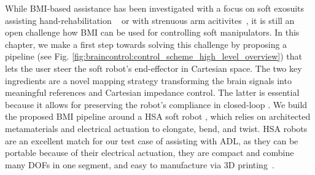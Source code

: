 While \gls{BMI}-based assistance has been investigated with a focus on 
soft exosuits assisting hand-rehabilitation ~\citep{zhang2019eeg} or with strenuous arm acitivites~\citep{tacca2022neuro}, 
it is still an open challenge how \gls{BMI} can be used for controlling soft manipulators. 
In this chapter, we make a first step towards solving this challenge by proposing a pipeline (see Fig. \ref{fig:braincontrol:control_scheme_high_level_overview}) that lets the user steer the soft robot's end-effector in Cartesian space. The two key ingredients are a novel mapping strategy transforming the brain signals into meaningful references and Cartesian impedance control. The latter is essential because it allows for preserving the robot's compliance in closed-loop \citep{della2017controlling}. We build the proposed \gls{BMI} pipeline around a \gls{HSA} soft robot \citep{stolzle2023modelling, stolzle2024experimental}, %
which relies on architected metamaterials and electrical actuation to elongate, bend, and twist.
\gls{HSA} robots are an excellent match for our test case of assisting with \gls{ADL}, as they can be portable because of their electrical actuation, they are compact and combine many \glspl{DOF} in one segment, and easy to manufacture via 3D printing~\citep{truby2021recipe}.

